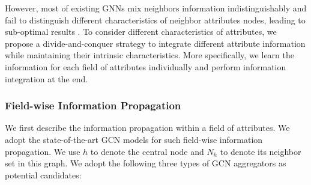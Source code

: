 However, most of existing GNNs mix neighbors information indistinguishably and fail to distinguish different characteristics of neighbor attributes nodes, leading to sub-optimal results \cite{kipf2016semi,wang2019neural,he2020lightgcn}.
To consider different characteristics of attributes, we propose a divide-and-conquer strategy to integrate different attribute information while maintaining their intrinsic characteristics.
More specifically, we learn the information for each field of attributes individually and perform information integration at the end.
\subsubsection{Field-wise Information Propagation}\label{Field-wise Information Propagation}
We first describe the information propagation within a field of attributes.
We adopt the state-of-the-art GCN models for such field-wise information propagation.
We use $h$ to denote the central node and $N_h$ to denote its neighbor set in this graph.
We adopt the following three types of GCN aggregators as potential candidates:
